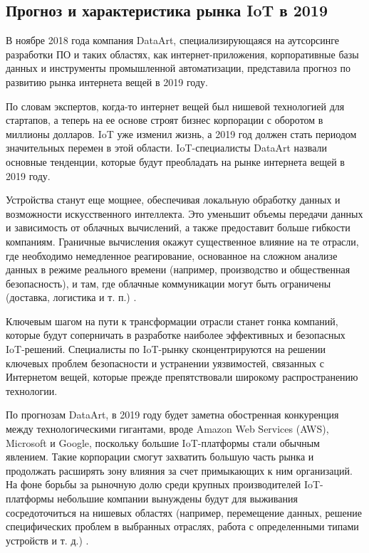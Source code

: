 \subsection{Прогноз и характеристика рынка IoT в 2019}
\label{sec:analysis:data_art}

В ноябре 2018 года компания DataArt, специализирующаяся на аутсорсинге разработки ПО и таких областях, как интернет-приложения, корпоративные базы данных и инструменты промышленной автоматизации, представила прогноз по развитию рынка интернета вещей в 2019 году.

По словам экспертов, когда-то интернет вещей был нишевой технологией для стартапов, а теперь на ее основе строят бизнес корпорации с оборотом в миллионы долларов. IoT уже изменил жизнь, а 2019 год должен стать периодом значительных перемен в этой области. IoT-специалисты DataArt назвали основные тенденции, которые будут преобладать на рынке интернета вещей в 2019 году.

Устройства станут еще мощнее, обеспечивая локальную обработку данных и возможности искусственного интеллекта. Это уменьшит объемы передачи данных и зависимость от облачных вычислений, а также предоставит больше гибкости компаниям. Граничные вычисления окажут существенное влияние на те отрасли, где необходимо немедленное реагирование, основанное на сложном анализе данных в режиме реального времени (например, производство и общественная безопасность), и там, где облачные коммуникации могут быть ограничены (доставка, логистика и т. п.) \cite{iot_data_2019}.

Ключевым шагом на пути к трансформации отрасли станет гонка компаний, которые будут соперничать в разработке наиболее эффективных и безопасных IoT-решений. Специалисты по IoT-рынку сконцентрируются на решении ключевых проблем безопасности и устранении уязвимостей, связанных с Интернетом вещей, которые прежде препятствовали широкому распространению технологии.

По прогнозам DataArt, в 2019 году будет заметна обостренная конкуренция между технологическими гигантами, вроде Amazon Web Services (AWS), Microsoft и Google, поскольку большие IoT-платформы стали обычным явлением. Такие корпорации смогут захватить большую часть рынка и продолжать расширять зону влияния за счет примыкающих к ним организаций. На фоне борьбы за рыночную долю среди крупных производителей IoT-платформы небольшие компании вынуждены будут для выживания сосредоточиться на нишевых областях (например, перемещение данных, решение специфических проблем в выбранных отраслях, работа с определенными типами устройств и т. д.) \cite{iot_data_2019}.

